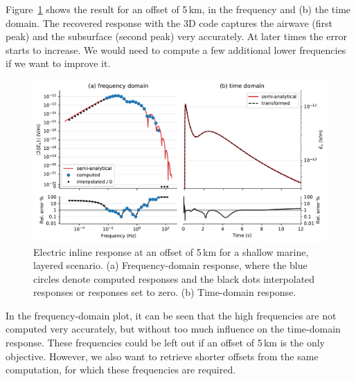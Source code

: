 \documentclass[extra, camera,%
    onecolumn,   %
    referee,     %
]{gji}
\newlength{\fwidth}
\begin{document}
Figure~\ref{fig:marine} shows the result for an offset of 5\,km,  in
 the frequency  and (b)  the time domain.
The recovered response with the 3D code captures the airwave (first peak) and
the subsurface (second peak) very accurately. At later times the error starts
to increase. We would need to compute a few additional lower frequencies if we
want to improve it.
%
\begin{figure}
  \centering
  \includegraphics[width=\fwidth]{06-marine}
  \caption{Electric inline response at an offset of 5\,km for a shallow marine,
    layered scenario. (a) Frequency-domain response, where the blue circles
    denote computed responses and the black dots interpolated responses or
    responses set to zero. (b) Time-domain response.}
  \label{fig:marine}
\end{figure}
%
In the frequency-domain plot, it can be seen that the high frequencies are not
computed very accurately, but without too much influence on the time-domain
response. These frequencies could be left out if an offset of 5\,km is the only
objective. However, we also want to retrieve shorter offsets from the same
computation, for which these frequencies are required.
\end{document}
